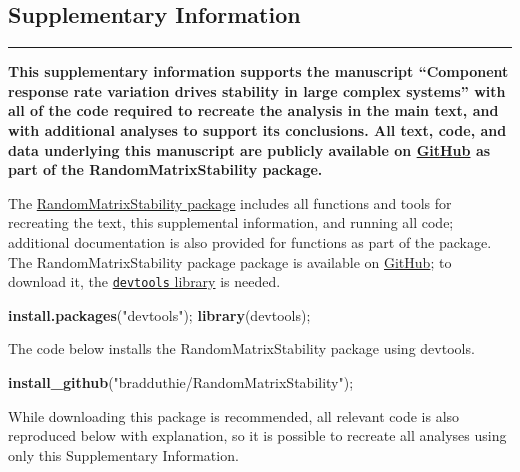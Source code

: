 \documentclass[]{article}
\newenvironment{Shaded}{\begin{snugshade}}{\end{snugshade}}
\newcommand{\KeywordTok}[1]{\textcolor[rgb]{0.13,0.29,0.53}{\textbf{{#1}}}}
\newcommand{\StringTok}[1]{\textcolor[rgb]{0.31,0.60,0.02}{{#1}}}
\newcommand{\NormalTok}[1]{{#1}}
\begin{document}
\clearpage

\begin{center}
\hypertarget{SIstart}{\section{Supplementary Information}\label{SIstart}}
\end{center}

\begin{center}\rule{0.5\linewidth}{\linethickness}\end{center}

\textbf{This supplementary information supports the manuscript
``Component response rate variation drives stability in large complex
systems'' with all of the code required to recreate the analysis in the
main text, and with additional analyses to support its conclusions. All
text, code, and data underlying this manuscript are publicly available
on \href{https://github.com/bradduthie/RandomMatrixStability}{GitHub}
as part of the RandomMatrixStability package.}

The
\href{https://github.com/bradduthie/RandomMatrixStability}{RandomMatrixStability
package} includes all functions and tools for recreating the text, this
supplemental information, and running all code; additional documentation
is also provided for functions as part of the package. The
RandomMatrixStability package package is available on
\href{https://github.com/bradduthie/RandomMatrixStability}{GitHub}; to
download it, the
\href{https://cran.r-project.org/web/packages/devtools/index.html}{\texttt{devtools}
library} is needed.

\begin{Shaded}
\begin{Highlighting}[]
\KeywordTok{install.packages}\NormalTok{(}\StringTok{"devtools"}\NormalTok{);}
\KeywordTok{library}\NormalTok{(devtools);}
\end{Highlighting}
\end{Shaded}

The code below installs the RandomMatrixStability package using
devtools.

\begin{Shaded}
\begin{Highlighting}[]
\KeywordTok{install_github}\NormalTok{(}\StringTok{"bradduthie/RandomMatrixStability"}\NormalTok{);}
\end{Highlighting}
\end{Shaded}

While downloading this package is recommended, all relevant code is also
reproduced below with explanation, so it is possible to recreate all
analyses using only this Supplementary Information.
\end{document}
